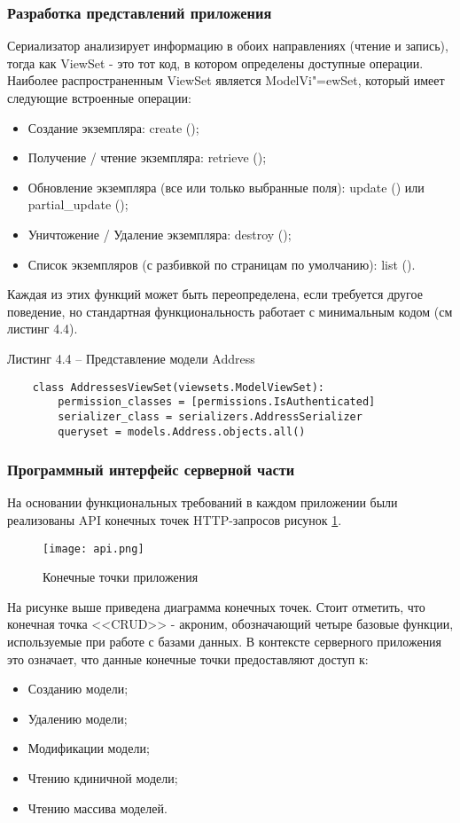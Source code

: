 \subsubsection{Разработка представлений приложения}\hfill

Сериализатор анализирует информацию в обоих направлениях (чтение и запись), тогда как ViewSet - это тот код, в котором определены доступные операции.
Наиболее распространенным ViewSet является ModelVi"=ewSet, который имеет следующие встроенные операции:
\begin{itemize}
    \item Создание экземпляра: create ();
    \item Получение / чтение экземпляра: retrieve ();
    \item Обновление экземпляра (все или только выбранные поля): update () или partial\_update ();
    \item Уничтожение / Удаление экземпляра: destroy ();
    \item Список экземпляров (с разбивкой по страницам по умолчанию): list ().
\end{itemize}

Каждая из этих функций может быть переопределена, если требуется другое поведение, но стандартная функциональность работает с минимальным кодом (см листинг 4.4).

Листинг 4.4 – Представление модели Address
\begin{lstlisting}
    class AddressesViewSet(viewsets.ModelViewSet):
        permission_classes = [permissions.IsAuthenticated]
        serializer_class = serializers.AddressSerializer
        queryset = models.Address.objects.all()
\end{lstlisting}

\subsubsection{Программный интерфейс серверной части}\hfill

На основании функциональных требований в каждом приложении были реализованы API конечных точек HTTP-запросов рисунок \ref{back:api}.

\begin{figure}
    \texttt{[image: api.png]}
    \caption{Конечные точки приложения}
    \label{back:api}
\end{figure}

На рисунке выше приведена диаграмма конечных точек.
Стоит отметить, что конечная точка <<CRUD>> -  акроним, обозначающий четыре базовые функции, используемые при работе с базами данных.
В контексте серверного приложения это означает, что данные конечные точки предоставляют доступ к:
\begin{itemize}
    \item Созданию модели;
    \item Удалению модели;
    \item Модификации модели;
    \item Чтению кдиничной модели;
    \item Чтению массива моделей.
\end{itemize}

